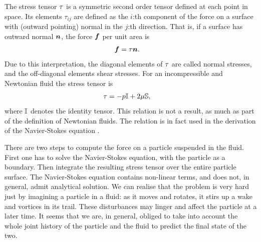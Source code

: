 \documentclass[thesis.tex]{subfiles}
\begin{document}
The stress tensor $\mathbb{\tau}$ is a symmetric second order tensor defined at each point in space. Its elements $\tau_{ij}$ are defined as the $i$:th component of the force on a surface with (outward pointing) normal in the $j$:th direction. That is, if a surface has outward normal $\mbox{\boldmath$n$}$, the force $\mbox{\boldmath$f$}$ per unit area is
\begin{align*}
	\mbox{\boldmath$f$} &= \mathbb{\tau} \mbox{\boldmath$n$}.
\end{align*}
Due to this interpretation, the diagonal elements of $\mathbb{\tau}$ are called normal stresses, and the off-diagonal elements shear stresses. For an incompressible and Newtonian fluid the stress tensor is
\begin{align*}
	\mathbb{\tau} &= -p \mathbb{I} + 2\mu \mathbb{S},
\end{align*}
where $\mathbb{I}$ denotes the identity tensor. This relation is not a result, as much as part of the definition of Newtonian fluids. The relation is in fact used in the derivation of the Navier-Stokes equation . 

There are two steps to compute the force on a particle suspended in the fluid. First one has to solve the Navier-Stokes equation, with the particle as a boundary. Then integrate the resulting stress tensor over the entire particle surface. The Navier-Stokes equation  contains non-linear terms, and does not, in general, admit analytical solution. We can realise that the problem is very hard just by imagining a particle in a fluid: as it moves and rotates, it stirs up a wake and vortices in its trail. These disturbances may linger and affect the particle at a later time. It seems that we are, in general, obliged to take into account the whole joint history of the particle and the fluid to predict the final state of the two.
\end{document}
